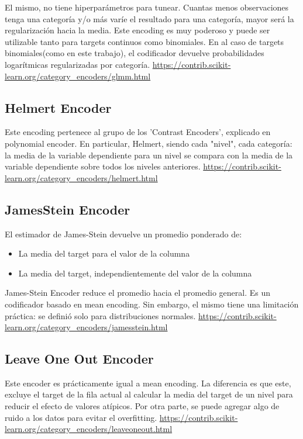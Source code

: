 \documentclass[12pt,a4paper]{article}
\begin{document}
El mismo, no tiene hiperparámetros para tunear. Cuantas menos observaciones tenga una categoría y/o más varíe el resultado para una categoría, mayor será la regularización hacia la media. Este encoding es muy poderoso y puede ser utilizable tanto para targets continuos como binomiales. En al caso de targets binomiales(como en este trabajo), el codificador devuelve probabilidades logarítmicas regularizadas por categoría.
\url{https://contrib.scikit-learn.org/category_encoders/glmm.html}

\subsection{Helmert Encoder}

Este encoding pertenece al grupo de los 'Contrast Encoders', explicado en polynomial encoder.
En particular, Helmert, siendo cada "nivel", cada categoría: la media de la variable dependiente para un nivel se compara con la media de la variable dependiente sobre todos los niveles anteriores.
\url{https://contrib.scikit-learn.org/category_encoders/helmert.html}

\subsection{JamesStein Encoder}
El estimador de James-Stein devuelve un promedio ponderado de:
\begin{itemize}
    \item La media del target para el valor de la columna 
    \item La media del target, independientemente del valor de la columna
\end{itemize}
James-Stein Encoder reduce el promedio hacia el promedio general. Es un codificador basado en mean encoding. Sin embargo, el mismo tiene una limitación práctica: se definió solo para distribuciones normales.
\url{https://contrib.scikit-learn.org/category_encoders/jamesstein.html}

\subsection{Leave One Out Encoder}
Este encoder es prácticamente igual a mean encoding. La diferencia es que este, excluye el target de la fila actual al calcular la media del target de un nivel para reducir el efecto de valores atípicos. \newline
Por otra parte, se puede agregar algo de ruido a los datos para evitar el overfitting. 
\url{https://contrib.scikit-learn.org/category_encoders/leaveoneout.html}
\end{document}
